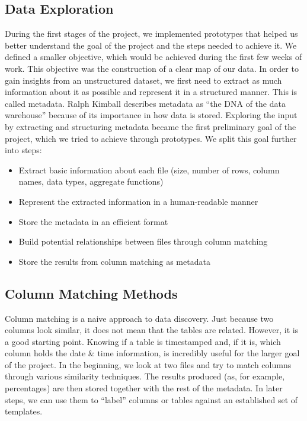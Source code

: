 \subsection{Data Exploration}

During the first stages of the project, we implemented prototypes that helped us better understand the goal of the project
and the steps needed to achieve it.
We defined a smaller objective, which would be achieved during the first few weeks of work.
This objective was the construction of a clear map of our data.
In order to gain insights from an unstructured dataset, we first need to extract as much information about it as possible
and represent it in a structured manner.
This is called metadata.
Ralph Kimball describes metadata as ``the DNA of the data warehouse''\cite{Kimball2008} because of its importance in how data is stored.
Exploring the input by extracting and structuring metadata became the first preliminary goal of the project, which we tried
to achieve through prototypes.
\bigbreak
We split this goal further into steps:
\begin{itemize}
    \item Extract basic information about each file (size, number of rows, column names, data types, aggregate functions)
    \item Represent the extracted information in a human-readable manner
    \item Store the metadata in an efficient format
    \item Build potential relationships between files through column matching
    \item Store the results from column matching as metadata
\end{itemize}

\subsection{Column Matching Methods}

Column matching is a naive approach to data discovery.
Just because two columns look similar, it does not mean that the tables are related.
However, it is a good starting point.
Knowing if a table is timestamped and, if it is, which column holds the date \& time information, is incredibly useful for
the larger goal of the project.
In the beginning, we look at two files and try to match columns through various similarity techniques.
The results produced (as, for example, percentages) are then stored together with the rest of the metadata.
In later steps, we can use them to ``label'' columns or tables against an established set of templates.

